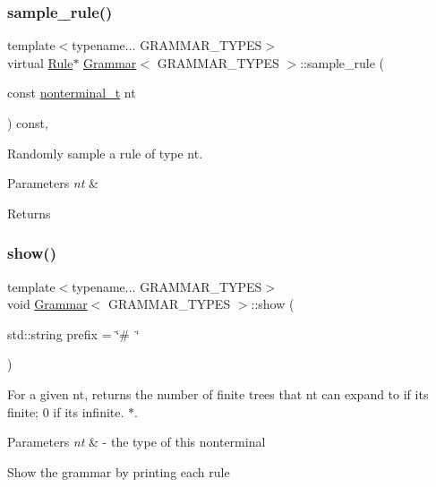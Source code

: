 \subsubsection{\texorpdfstring{sample\+\_\+rule()}{sample\_rule()}}
{\footnotesize\ttfamily template$<$typename... G\+R\+A\+M\+M\+A\+R\+\_\+\+T\+Y\+P\+ES$>$ \\
virtual \hyperlink{class_rule}{Rule}$\ast$ \hyperlink{class_grammar}{Grammar}$<$ G\+R\+A\+M\+M\+A\+R\+\_\+\+T\+Y\+P\+ES $>$\+::sample\+\_\+rule (\begin{DoxyParamCaption}\item[{const \hyperlink{_nonterminal_8h_a1c5bfe9b903f69c83bbde5da7035fef3}{nonterminal\+\_\+t}}]{nt }\end{DoxyParamCaption}) const\hspace{0.3cm}{\ttfamily [inline]}, {\ttfamily [virtual]}}

Randomly sample a rule of type nt. 
\begin{DoxyParams}{Parameters}
{\em nt} & \\
\hline
\end{DoxyParams}
\begin{DoxyReturn}{Returns}

\end{DoxyReturn}
\mbox{\label{class_grammar_a8d661258f08b7cc4d154d59bfbbc1f68}} 
\subsubsection{\texorpdfstring{show()}{show()}}
{\footnotesize\ttfamily template$<$typename... G\+R\+A\+M\+M\+A\+R\+\_\+\+T\+Y\+P\+ES$>$ \\
void \hyperlink{class_grammar}{Grammar}$<$ G\+R\+A\+M\+M\+A\+R\+\_\+\+T\+Y\+P\+ES $>$\+::show (\begin{DoxyParamCaption}\item[{std\+::string}]{prefix = {\ttfamily \char`\"{}\#~\char`\"{}} }\end{DoxyParamCaption})\hspace{0.3cm}{\ttfamily [inline]}}



For a given nt, returns the number of finite trees that nt can expand to if its finite; 0 if its infinite. $\ast$. 


\begin{DoxyParams}{Parameters}
{\em nt} & -\/ the type of this nonterminal \\
\hline
\end{DoxyParams}
Show the grammar by printing each rule

